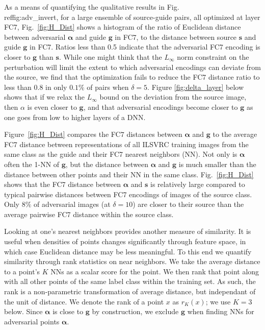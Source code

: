 \documentclass{article} %
\newcommand{\source}{{\boldsymbol{\mathbf{s}}}}\newcommand{\guide}{\boldsymbol{\mathbf{g}}}\newcommand{\adv}{\boldsymbol{\mathbf{\alpha}}}\newcommand{\neigh}[2]{\ensuremath{n_{#1} ({#2})}}\newcommand{\Neighs}[2]{\ensuremath{\mathcal{N}}_{{#1}} ({#2})}\newcommand{\NNavg}[2]{\ensuremath{a_{#1} ({#2})}}\newcommand{\NNz}[2]{\ensuremath{z_{#1} ({#2})}}\newcommand{\class}[1]{C ({#1})}\newcommand{\dist}[2]{\ensuremath{D ({#1}, {#2})}}\newcommand{\rank}[2]{\ensuremath{r_{#1} ({#2})}}\newcommand{\rankdiff}[1]{\ensuremath{\Delta{r_{#1}}}}\newcommand{\dlike}[2]{\ensuremath{\Delta L({#1}, {#2})}}%
\begin{document}
As a means of quantifying the qualitative results in Fig.\\ref{fig:adv_invert}, for a large ensemble of source-guide pairs,
all optimized at layer FC7, Fig.~\ref{fig:H_Dist}
shows a histogram of the ratio of Euclidean distance between adversarial
$\adv$ and guide $\guide$ in FC7, to the distance between source
$\source$ and guide $\guide$ in FC7.
Ratios less than 0.5 indicate that the adversarial FC7
encoding is closer to $\guide$ than $\source$.
While one might think that the $L_\infty$ norm constraint on the
perturbation will limit the extent to which adversarial encodings
can deviate from the source, we find that the optimization fails
to reduce the FC7 distance ratio to less than $0.8$ in only $0.1\%$
of pairs when $\delta=5$.
Figure \ref{fig:delta_layer} below shows that if we relax the
$L_\infty$ bound on the deviation from the source image, then $\alpha$
is even closer to $\guide$, and that adversarial encodings become
closer to $\guide$ as one goes from low to higher layers of a DNN.


Figure~\ref{fig:H_Dist} compares the FC$7$
distances between $\adv$ and $\guide$ to the average FC7 distance between
representations of all ILSVRC training images from the same class as
the guide and their FC7 nearest neighbors (NN).
Not only is $\adv$ often the 1-NN of $\guide$, but the distance between
$\adv$ and $\guide$ is much smaller than the distance between other
points and their NN in the same class.
Fig.~\ref{fig:H_Dist} shows that the FC7 distance
between $\adv$ and $\source$ is relatively large compared to typical
pairwise distances between FC7 encodings of images of the source class.
Only $8\%$ of adversarial images  (at $\delta=10$) are closer to their
source than the average pairwise FC7 distance within the source class.

Looking at one's nearest neighbors provides another measure of similarity.
It is useful when densities of points changes significantly through
feature space, in which case Euclidean distance may be less meaningful.
To this end we quantify similarity through rank statistics on near neighbors.
We take the average distance to a point's $K$ NNs as a scalar score
for the point.  We then rank that point along with all other points of
the same label class within the training set.  As such, the rank is a
non-parametric transformation of average distance, but independant of
the unit of distance.  We denote the rank of a point $x$ as $\rank{K}{x}$;
we use $K=3$ below.  Since $\adv$ is close to $\guide$ by construction,
we exclude $\guide$ when finding NNs for adversarial points $\adv$.
\end{document}
